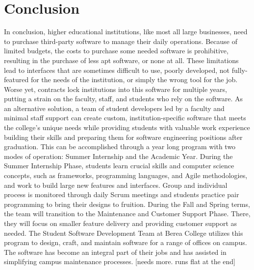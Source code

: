 \section{Conclusion}
In conclusion, higher educational institutions, like most all large businesses, need to purchase third-party software to manage their daily operations. Because of limited budgets, the costs to purchase some needed software is prohibitive, resulting in the purchase of less apt software, or none at all. These limitations lead to interfaces that are sometimes difficult to use, poorly developed, not fully-featured for the needs of the institution, or simply the wrong tool for the job. Worse yet, contracts lock institutions into this software for multiple years, putting a strain on the faculty, staff, and students who rely on the software. As an alternative solution, a team of student developers led by a faculty and minimal staff support can create custom, institution-specific software that meets the college's unique needs while providing students with valuable work experience building their skills and preparing them for software engineering positions after graduation. This can be accomplished through a year long program with two modes of operation: Summer Internship and the Academic Year. During the Summer Internship Phase, students learn crucial skills and computer science concepts, such as frameworks, programming languages, and Agile methodologies, and work to build large new features and interfaces. Group and individual process is monitored through daily Scrum meetings and students practice pair programming to bring their designs to fruition. During the Fall and Spring terms, the team will transition to the Maintenance and Customer Support Phase. There, they will focus on smaller feature delivery and providing customer support as needed. The Student Software Development Team at Berea College utilizes this program to design, craft, and maintain software for a range of offices on campus. The software has become an integral part of their jobs and has assisted in simplifying campus maintenance processes. [needs more. runs flat at the end]


